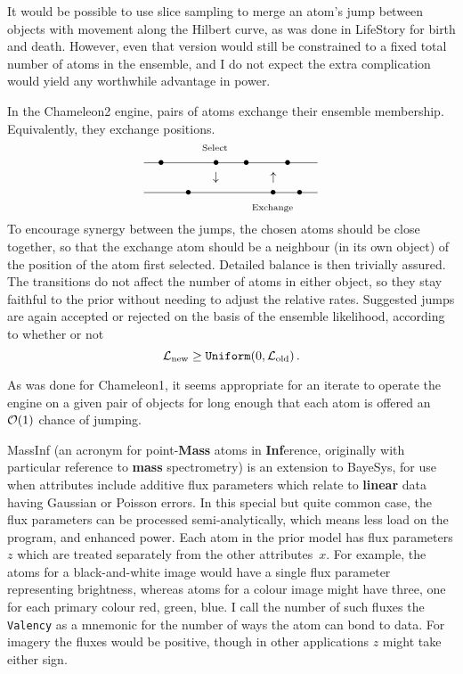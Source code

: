 It would be possible to use slice sampling to merge an atom's jump between objects with movement along the Hilbert curve, 
as was done in LifeStory for birth and death.
However, even that version would still be constrained to a fixed total number of atoms in the ensemble,
and I do not expect the extra complication would yield any worthwhile advantage in power.

\bigskip
{}
\smallskip

In the Chameleon2 engine, pairs of atoms exchange their ensemble membership.
Equivalently, they exchange positions.
$$
\vbox{\hbox{\hskip 47pt {$\scriptstyle\rm Select$}}
      \hbox{{\raise2pt\hbox to 140pt{\hrulefill}} \hskip -132pt $\bullet$ \hskip 36pt $\bullet$ \hskip 16pt $\bullet$ \hskip 25pt $\bullet$ \hskip 19pt}
      \hbox{\hskip 55.5pt $\downarrow$ \hskip 38pt $\uparrow$}
      \hbox{{\raise2pt\hbox to 140pt{\hrulefill}} \hskip -110pt $\bullet$ \hskip 60pt $\bullet$ \hskip 13pt $\bullet$ \hskip 9pt}
      \hbox{\hskip 87pt {$\scriptstyle\rm Exchange$}}
     }
$$
To encourage synergy between the jumps, the chosen atoms should be close together, 
so that the exchange atom should be a neighbour (in its own object) of the position of the atom first selected.
Detailed balance is then trivially assured.
The transitions do not affect the number of atoms in either object, so they stay faithful to the prior without needing to adjust the relative rates.
Suggested jumps are again accepted or rejected on the basis of the ensemble likelihood, according to whether or not
$$
  {\cal L}_{\rm new} \ge {\tt Uniform}(0,{\cal L}_{\rm old})\,.
$$

As was done for Chameleon1, it seems appropriate for an iterate to operate the engine on a given pair of objects
for long enough that each atom is offered an ${\cal O}(1)$ chance of jumping.

\vfill\eject

\bigskip

MassInf (an acronym for point-{\bf Mass} atoms in {\bf Inf}erence, originally with particular reference to {\bf mass} spectrometry) is an extension to BayeSys,
for use when attributes include additive flux parameters which relate to {\bf linear} data having Gaussian or Poisson errors.  
In this special but quite common case, the flux parameters can be processed semi-analytically, which means less load on the program, and enhanced power.
Each atom in the prior model has flux parameters $z$ which are treated separately from the other attributes~$x$.
For example, the atoms for a black-and-white image would have a single flux parameter representing brightness,
whereas atoms for a colour image might have three, one for each primary colour red, green, blue.
I call the number of such fluxes the {\tt Valency} as a mnemonic for the number of ways the atom can bond to data.
For imagery the fluxes would be positive, though in other applications $z$ might take either sign.

